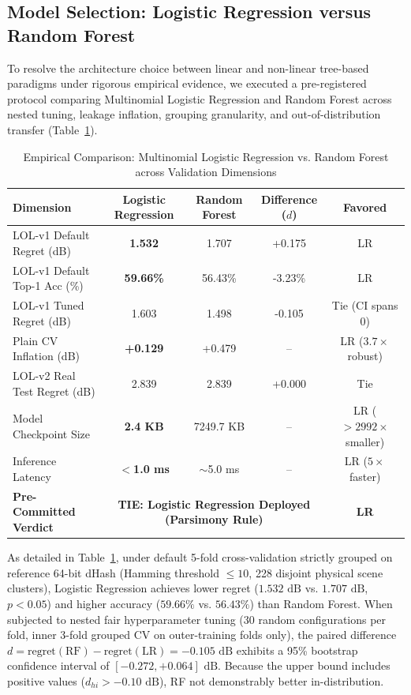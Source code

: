 \documentclass[journal]{IEEEtran}
\begin{document}
\subsection{Model Selection: Logistic Regression versus Random Forest}
To resolve the architecture choice between linear and non-linear tree-based paradigms under rigorous empirical evidence, we executed a pre-registered protocol comparing Multinomial Logistic Regression and Random Forest across nested tuning, leakage inflation, grouping granularity, and out-of-distribution transfer (Table~\ref{tab:model_comparison}).

\begin{table}[t]
\caption{Empirical Comparison: Multinomial Logistic Regression vs. Random Forest across Validation Dimensions}
\label{tab:model_comparison}
\centering
\scriptsize
\begin{tabular}{lcccc}
\hline
\textbf{Dimension} & \textbf{Logistic Regression} & \textbf{Random Forest} & \textbf{Difference ($d$)} & \textbf{Favored} \\
\hline
LOL-v1 Default Regret (dB) & \textbf{1.532} & 1.707 & +0.175 & LR \\
LOL-v1 Default Top-1 Acc (\%) & \textbf{59.66\%} & 56.43\% & -3.23\% & LR \\
LOL-v1 Tuned Regret (dB) & 1.603 & 1.498 & -0.105 & Tie (CI spans 0) \\
Plain CV Inflation (dB) & \textbf{+0.129} & +0.479 & -- & LR ($3.7\times$ robust) \\
LOL-v2 Real Test Regret (dB) & 2.839 & 2.839 & +0.000 & Tie \\
Model Checkpoint Size & \textbf{2.4 KB} & 7249.7 KB & -- & LR ($>2992\times$ smaller) \\
Inference Latency & \textbf{$<$1.0 ms} & $\sim$5.0 ms & -- & LR ($5\times$ faster) \\
\hline
\textbf{Pre-Committed Verdict} & \multicolumn{3}{c}{\textbf{TIE: Logistic Regression Deployed (Parsimony Rule)}} & \textbf{LR} \\
\hline
\end{tabular}
\end{table}

As detailed in Table~\ref{tab:model_comparison}, under default 5-fold cross-validation strictly grouped on reference 64-bit dHash (Hamming threshold $\le 10$, 228 disjoint physical scene clusters), Logistic Regression achieves lower regret ($1.532\text{ dB}$ vs. $1.707\text{ dB}$, $p < 0.05$) and higher accuracy ($59.66\%$ vs. $56.43\%$) than Random Forest. When subjected to nested fair hyperparameter tuning (30 random configurations per fold, inner 3-fold grouped CV on outer-training folds only), the paired difference $d = \text{regret}(\text{RF}) - \text{regret}(\text{LR}) = -0.105\text{ dB}$ exhibits a 95\% bootstrap confidence interval of $[-0.272, +0.064]\text{ dB}$. Because the upper bound includes positive values ($d_{hi} > -0.10\text{ dB}$), RF not demonstrably better in-distribution.
\end{document}
